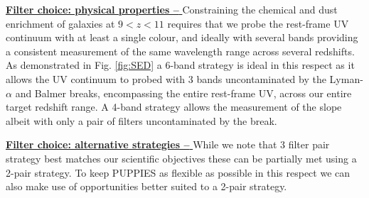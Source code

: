 \documentclass[12pt]{article}
\begin{document}
\noindent
\underline{\bf Filter choice: physical properties -- } Constraining the chemical and dust enrichment of galaxies at $9<z<11$ requires that we probe the rest-frame UV continuum with at least a single colour, and ideally with several bands providing a consistent measurement of the same wavelength range across several redshifts. As demonstrated in Fig. \ref{fig:SED} a 6-band strategy is ideal in this respect as it allows the UV continuum to probed with 3 bands uncontaminated by the Lyman-$\alpha$ and Balmer breaks, encompassing the entire rest-frame UV, across our entire target redshift range. A 4-band strategy allows the measurement of the slope albeit with only a pair of filters uncontaminated by the break.

\vspace{5mm}
\noindent
\underline{\bf Filter choice: alternative strategies -- } While we note that 3 filter pair strategy best matches our scientific objectives these can be partially met using a 2-pair strategy. To keep PUPPIES as flexible as possible in this respect we can also make use of opportunities better suited to a 2-pair strategy.
\end{document}

